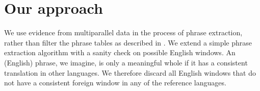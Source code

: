 \documentclass[11pt]{article}
\begin{document}

\section{Our approach}
We use evidence from multiparallel data in the process of phrase extraction, rather than filter the phrase tables as described in \cite{chen}. We extend a simple phrase extraction algorithm with a sanity check on possible English windows. An (English) phrase, we imagine, is only a meaningful whole if it has a consistent translation in other languages. We therefore discard all English windows that do not have a consistent foreign window in any of the reference languages.
\end{document}
